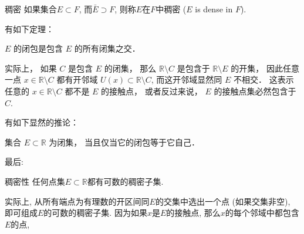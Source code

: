 \begin{definition}{稠密}
如果集合$E\subset F$, 而$\bar E\supset F$, 则称$E$在$F$中稠密 ($E$ is dense in $F$).
\end{definition}

有如下定理：

\begin{theorem}{}
$E$ 的闭包是包含 $E$ 的所有闭集之交．
\end{theorem}
实际上， 如果 $C$ 是包含 $E$ 的闭集， 那么 $\mathbb{R}\setminus C$ 是包含于 $\mathbb{R}\setminus E$ 的开集， 因此任意一点 $x\in\mathbb{R}\setminus C$ 都有开邻域 $U(x)\subset\mathbb{R}\setminus C$, 而这开邻域显然同 $E$ 不相交． 这表示任意的 $x\in\mathbb{R}\setminus C$ 都不是 $E$ 的接触点， 或者反过来说， $E$ 的接触点集必然包含于 $C$. 

有如下显然的推论：
\begin{corollary}{}
集合 $E\subset\mathbb{R}$ 为闭集， 当且仅当它的闭包等于它自己．
\end{corollary}

最后:
\begin{theorem}{稠密性}
任何点集$E\subset\mathbb{R}$都有可数的稠密子集.
\end{theorem}
实际上, 从所有端点为有理数的开区间同$E$的交集中选出一个点 (如果交集非空), 即可组成$E$的可数的稠密子集. 因为如果$x$是$E$的接触点, 那么$x$的每个邻域中都包含$E$的点, 